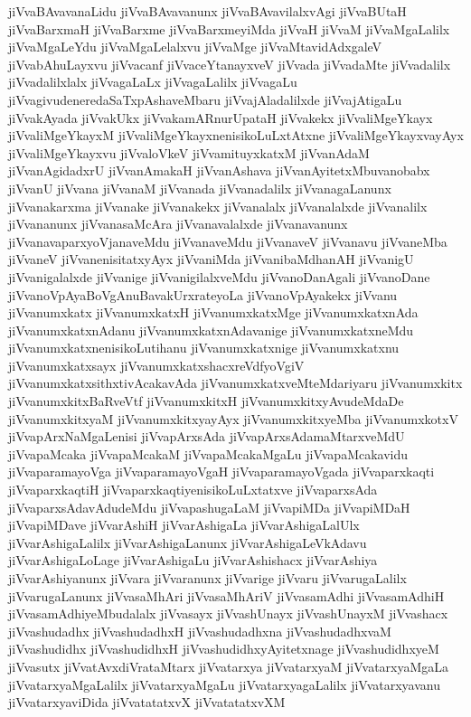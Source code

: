 {jiVvaBAvavanaLidu
jiVvaBAvavanunx
jiVvaBAvavilalxvAgi
jiVvaBUtaH
jiVvaBarxmaH
jiVvaBarxme
jiVvaBarxmeyiMda
jiVvaH
jiVvaM
jiVvaMgaLalilx
jiVvaMgaLeYdu
jiVvaMgaLelalxvu
jiVvaMge
jiVvaMtavidAdxgaleV
jiVvabAhuLayxvu
jiVvacanf
jiVvaceYtanayxveV
jiVvada
jiVvadaMte
jiVvadalilx
jiVvadalilxlalx
jiVvagaLaLx
jiVvagaLalilx
jiVvagaLu
jiVvagivudeneredaSaTxpAshaveMbaru
jiVvajAladalilxde
jiVvajAtigaLu
jiVvakAyada
jiVvakUkx
jiVvakamARnurUpataH
jiVvakekx
jiVvaliMgeYkayx
jiVvaliMgeYkayxM
jiVvaliMgeYkayxnenisikoLuLxtAtxne
jiVvaliMgeYkayxvayAyx
jiVvaliMgeYkayxvu
jiVvaloVkeV
jiVvamituyxkatxM
jiVvanAdaM
jiVvanAgidadxrU
jiVvanAmakaH
jiVvanAshava
jiVvanAyitetxMbuvanobabx
jiVvanU
jiVvana
jiVvanaM
jiVvanada
jiVvanadalilx
jiVvanagaLanunx
jiVvanakarxma
jiVvanake
jiVvanakekx
jiVvanalalx
jiVvanalalxde
jiVvanalilx
jiVvananunx
jiVvanasaMcAra
jiVvanavalalxde
jiVvanavanunx
jiVvanavaparxyoVjanaveMdu
jiVvanaveMdu
jiVvanaveV
jiVvanavu
jiVvaneMba
jiVvaneV
jiVvanenisitatxyAyx
jiVvaniMda
jiVvanibaMdhanAH
jiVvanigU
jiVvanigalalxde
jiVvanige
jiVvanigilalxveMdu
jiVvanoDanAgali
jiVvanoDane
jiVvanoVpAyaBoVgAnuBavakUrxrateyoLa
jiVvanoVpAyakekx
jiVvanu
jiVvanumxkatx
jiVvanumxkatxH
jiVvanumxkatxMge
jiVvanumxkatxnAda
jiVvanumxkatxnAdanu
jiVvanumxkatxnAdavanige
jiVvanumxkatxneMdu
jiVvanumxkatxnenisikoLutihanu
jiVvanumxkatxnige
jiVvanumxkatxnu
jiVvanumxkatxsayx
jiVvanumxkatxshacxreVdfyoVgiV
jiVvanumxkatxsithxtivAcakavAda
jiVvanumxkatxveMteMdariyaru
jiVvanumxkitx
jiVvanumxkitxBaRveVtf
jiVvanumxkitxH
jiVvanumxkitxyAvudeMdaDe
jiVvanumxkitxyaM
jiVvanumxkitxyayAyx
jiVvanumxkitxyeMba
jiVvanumxkotxV
jiVvapArxNaMgaLenisi
jiVvapArxsAda
jiVvapArxsAdamaMtarxveMdU
jiVvapaMcaka
jiVvapaMcakaM
jiVvapaMcakaMgaLu
jiVvapaMcakavidu
jiVvaparamayoVga
jiVvaparamayoVgaH
jiVvaparamayoVgada
jiVvaparxkaqti
jiVvaparxkaqtiH
jiVvaparxkaqtiyenisikoLuLxtatxve
jiVvaparxsAda
jiVvaparxsAdavAdudeMdu
jiVvapashugaLaM
jiVvapiMDa
jiVvapiMDaH
jiVvapiMDave
jiVvarAshiH
jiVvarAshigaLa
jiVvarAshigaLalUlx
jiVvarAshigaLalilx
jiVvarAshigaLanunx
jiVvarAshigaLeVkAdavu
jiVvarAshigaLoLage
jiVvarAshigaLu
jiVvarAshishacx
jiVvarAshiya
jiVvarAshiyanunx
jiVvara
jiVvaranunx
jiVvarige
jiVvaru
jiVvarugaLalilx
jiVvarugaLanunx
jiVvasaMhAri
jiVvasaMhAriV
jiVvasamAdhi
jiVvasamAdhiH
jiVvasamAdhiyeMbudalalx
jiVvasayx
jiVvashUnayx
jiVvashUnayxM
jiVvashacx
jiVvashudadhx
jiVvashudadhxH
jiVvashudadhxna
jiVvashudadhxvaM
jiVvashudidhx
jiVvashudidhxH
jiVvashudidhxyAyitetxnage
jiVvashudidhxyeM
jiVvasutx
jiVvatAvxdiVrataMtarx
jiVvatarxya
jiVvatarxyaM
jiVvatarxyaMgaLa
jiVvatarxyaMgaLalilx
jiVvatarxyaMgaLu
jiVvatarxyagaLalilx
jiVvatarxyavanu
jiVvatarxyaviDida
jiVvatatatxvX
jiVvatatatxvXM
}
